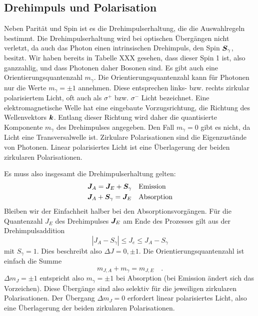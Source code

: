 \subsection{Drehimpuls und Polarisation}

Neben Parität und Spin ist es die Drehimpulserhaltung, die die Auswahlregeln bestimmt.
Die Drehimpulserhaltung wird bei optischen Übergängen nicht verletzt, da auch das Photon einen intrinsischen Drehimpuls, den Spin $\boldsymbol{S}_\gamma$, besitzt. Wir haben bereits in Tabelle XXX gesehen, dass dieser Spin 1 ist, also ganzzahlig, und dass Photonen daher Bosonen sind. Es gibt auch eine Orientierungsquantenzahl $m_\gamma$. Die Orientierungsquantenzahl kann für Photonen nur die Werte $m_\gamma = \pm 1$ annehmen. Diese entsprechen links- bzw. rechts zirkular polarisiertem Licht, oft auch als $\sigma^+$ bzw. $\sigma^-$ Licht bezeichnet. Eine elektromagnetische Welle hat eine eingebaute Vorzugsrichtung, die Richtung des Wellenvektors $\boldsymbol{k}$. Entlang dieser Richtung wird daher die quantisierte Komponente $m_\gamma$ des Drehimpulses angegeben. Den Fall $m_\gamma = 0$ gibt es nicht, da Licht eine Transversalwelle ist. Zirkulare Polarisationen sind die Eigenzustände von Photonen. Linear polarisiertes Licht ist eine Überlagerung der beiden zirkularen Polarisationen.

Es muss also insgesamt die Drehimpulserhaltung gelten:
\begin{align}
    \boldsymbol{J}_A = \boldsymbol{J}_E + \boldsymbol{S}_\gamma  & \quad \text{Emission} \\
    \boldsymbol{J}_A + \boldsymbol{S}_\gamma = \boldsymbol{J}_E & \quad \text{Absorption}
\end{align}
Bleiben wir der Einfachheit halber bei den Absorptionsvorgängen. Für die Quantenzahl $J_E$ des Drehimpulses $\boldsymbol{J}_E$ am Ende des Prozesses gilt aus der Drehimpulsaddition
\begin{equation}
    | J_A - S_\gamma | \le J_e \le J_A - S_\gamma
\end{equation}
mit $S_\gamma = 1$. Dies beschreibt also $\Delta J = 0, \pm 1$. Die Orientierungsquantenzahl ist einfach die Summe
\begin{equation}
    m_{J,A} + m_\gamma = m_{J,E} \quad .
\end{equation} 
$\Delta m_J = \pm 1$ entspricht also $ m_\gamma = \pm 1$ bei Absorption (bei Emission ändert sich das Vorzeichen). Diese Übergänge sind also selektiv für die jeweiligen zirkularen Polarisationen. Der Übergang $\Delta m_J = 0$ erfordert linear polarisiertes Licht, also eine Überlagerung der beiden zirkularen Polarisationen.


